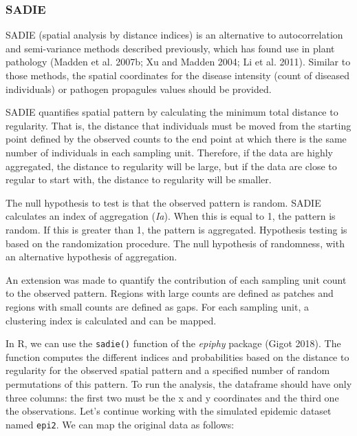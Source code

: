 \documentclass[
  letterpaper,
]{book}
\begin{document}
\hypertarget{sadie}{%
\subsubsection{SADIE}\label{sadie}}

SADIE (spatial analysis by distance indices) is an alternative to
autocorrelation and semi-variance methods described previously, which
has found use in plant pathology (Madden et al. 2007b; Xu and Madden
2004; Li et al. 2011). Similar to those methods, the spatial coordinates
for the disease intensity (count of diseased individuals) or pathogen
propagules values should be provided.

SADIE quantifies spatial pattern by calculating the minimum total
distance to regularity. That is, the distance that individuals must be
moved from the starting point defined by the observed counts to the end
point at which there is the same number of individuals in each sampling
unit. Therefore, if the data are highly aggregated, the distance to
regularity will be large, but if the data are close to regular to start
with, the distance to regularity will be smaller.

The null hypothesis to test is that the observed pattern is random.
SADIE calculates an index of aggregation (\emph{Ia}). When this is equal
to 1, the pattern is random. If this is greater than 1, the pattern is
aggregated. Hypothesis testing is based on the randomization procedure.
The null hypothesis of randomness, with an alternative hypothesis of
aggregation.

An extension was made to quantify the contribution of each sampling unit
count to the observed pattern. Regions with large counts are defined as
patches and regions with small counts are defined as gaps. For each
sampling unit, a clustering index is calculated and can be mapped.

In R, we can use the \texttt{sadie()} function of the \emph{epiphy}
package (Gigot 2018). The function computes the different indices and
probabilities based on the distance to regularity for the observed
spatial pattern and a specified number of random permutations of this
pattern. To run the analysis, the dataframe should have only three
columns: the first two must be the x and y coordinates and the third one
the observations. Let's continue working with the simulated epidemic
dataset named \texttt{epi2}. We can map the original data as follows:
\end{document}
